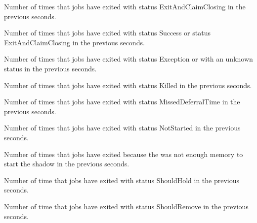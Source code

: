\begin{description}
\item[\AdAttr{RecentJobsExitedAndClaimClosing}:] Number of times that jobs have exited with status ExitAndClaimClosing
  in the previous  seconds.

\item[\AdAttr{RecentJobsExitedNormally}:] Number of times that jobs have exited with status Success or status ExitAndClaimClosing
  in the previous  seconds.

\item[\AdAttr{RecentJobsExitException}:] Number of times that jobs have exited with status Exception or with an unknown status
  in the previous  seconds.

\item[\AdAttr{RecentJobsKilled}:] Number of times that jobs have exited with status Killed
  in the previous  seconds.

\item[\AdAttr{RecentJobsMissedDeferralTime}:] Number of times that jobs have exited with status MissedDeferralTime
  in the previous  seconds.

\item[\AdAttr{RecentJobsNotStarted}:] Number of times that jobs have exited with status NotStarted
  in the previous  seconds.

\item[\AdAttr{RecentJobsShadowNoMemory}:] Number of times that jobs have exited because the was not enough memory to start the shadow
  in the previous  seconds.

\item[\AdAttr{RecentJobsShouldHold}:] Number of time that jobs have exited with status ShouldHold
  in the previous  seconds.

\item[\AdAttr{RecentJobsShouldRemove}:] Number of time that jobs have exited with status ShouldRemove
  in the previous  seconds.


\end{description}
